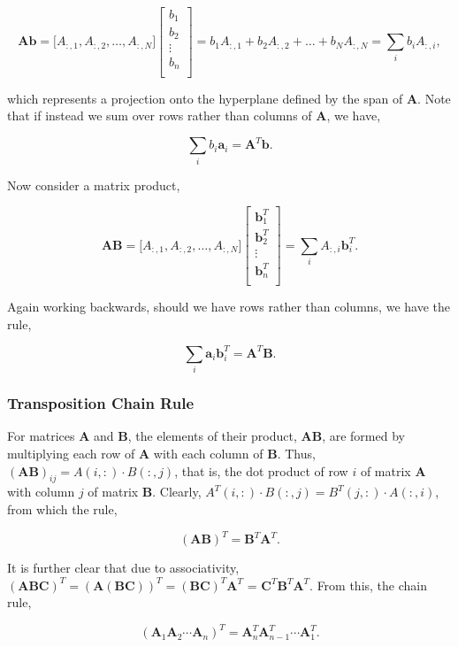 \documentclass[11pt]{amsart}
\begin{document}
$$\mathbf{A}\mathbf{b} = \big[A_{:, 1}, A_{:, 2}, \dots, A_{:, N}\big]
\begin{bmatrix}
b_1 \\
b_2 \\
\vdots \\
b_n \\
\end{bmatrix}
= b_1A_{:, 1} + b_2A_{:, 2} + \dots + b_NA_{:, N} = \sum_{i} b_iA_{:, i},$$

which represents a projection onto the hyperplane defined by the span of $\mathbf{A}$. Note that if instead we sum over rows rather than columns of $\mathbf{A}$, we have,

$$\sum_{i} b_i\mathbf{a}_i = \mathbf{A}^T\mathbf{b}.$$

Now consider a matrix product,

$$\mathbf{A}\mathbf{B} = \big[A_{:, 1}, A_{:, 2}, \dots, A_{:, N}\big]
\begin{bmatrix}
\mathbf{b}_1^T \\
\mathbf{b}_2^T \\
\vdots \\
\mathbf{b}_n^T \\
\end{bmatrix}
= \sum_{i} A_{:, i}\mathbf{b}_i^T.
$$

Again working backwards, should we have rows rather than columns, we have the rule,

$$\sum_{i} \mathbf{a}_i\mathbf{b}_i^T = \mathbf{A}^T\mathbf{B}.$$

\subsubsection{Transposition Chain Rule}

For matrices \textbf{A} and \textbf{B}, the elements of their product, \textbf{AB}, are formed by multiplying each row of \textbf{A} with each column of \textbf{B}. Thus, $(\textbf{AB})_{ij} = A(i, :) \cdot B(:, j)$, that is, the dot product of row $i$ of matrix \textbf{A} with column $j$ of matrix \textbf{B}. Clearly, $A^T(i, :) \cdot B(:, j)= B^T(j, :) \cdot A(:,i)$, from which the rule,

$$(\mathbf{AB})^T = \mathbf{B}^T\mathbf{A}^T.$$

It is further clear that due to associativity, $(\mathbf{ABC})^T = (\mathbf{A(BC)})^T = (\mathbf{BC})^T\mathbf{A}^T$ = $\mathbf{C}^T\mathbf{B}^T\mathbf{A}^T$. From this, the chain rule,

$$(\mathbf{A}_1\mathbf{A}_2\cdots \mathbf{A}_n)^T = \mathbf{A}_n^T\mathbf{A}_{n-1}^T\cdots\mathbf{A}_1^T.$$
\end{document}
